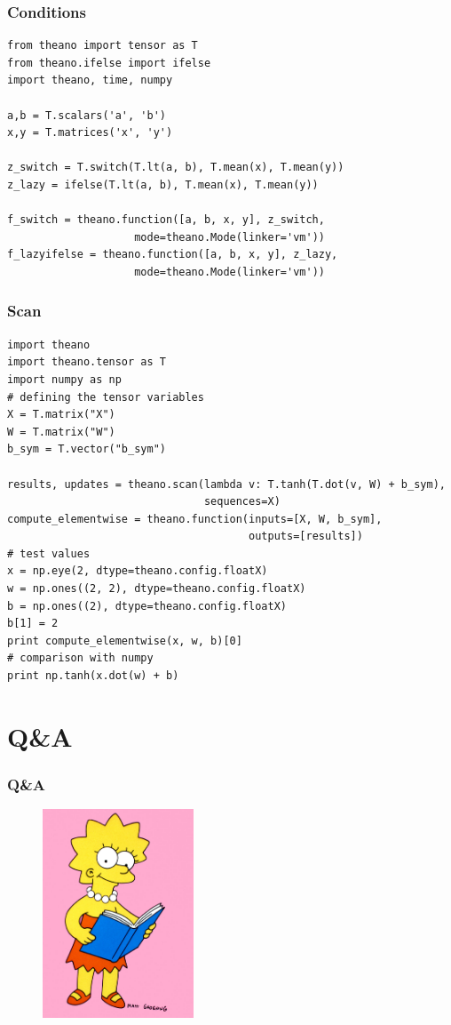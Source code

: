 \documentclass{beamer}
\begin{document}
\begin{frame}[fragile]
  \frametitle{Conditions}
\begin{verbatim}
from theano import tensor as T
from theano.ifelse import ifelse
import theano, time, numpy

a,b = T.scalars('a', 'b')
x,y = T.matrices('x', 'y')

z_switch = T.switch(T.lt(a, b), T.mean(x), T.mean(y))
z_lazy = ifelse(T.lt(a, b), T.mean(x), T.mean(y))

f_switch = theano.function([a, b, x, y], z_switch,
                    mode=theano.Mode(linker='vm'))
f_lazyifelse = theano.function([a, b, x, y], z_lazy,
                    mode=theano.Mode(linker='vm'))
\end{verbatim}
\end{frame}

\begin{frame}[fragile]
  \frametitle{Scan}

\begin{verbatim}
import theano
import theano.tensor as T
import numpy as np
# defining the tensor variables
X = T.matrix("X")
W = T.matrix("W")
b_sym = T.vector("b_sym")

results, updates = theano.scan(lambda v: T.tanh(T.dot(v, W) + b_sym),
                               sequences=X)
compute_elementwise = theano.function(inputs=[X, W, b_sym],
                                      outputs=[results])
# test values
x = np.eye(2, dtype=theano.config.floatX)
w = np.ones((2, 2), dtype=theano.config.floatX)
b = np.ones((2), dtype=theano.config.floatX)
b[1] = 2
print compute_elementwise(x, w, b)[0]
# comparison with numpy
print np.tanh(x.dot(w) + b)
\end{verbatim}
\end{frame}

\section*{Q\&A}

\begin{frame}
  \frametitle{Q\&A}

  \begin{figure}
    \centering
    \includegraphics[width=0.4\textwidth]{theanoqanda.jpg}
  \end{figure}
\end{frame}
\end{document}

